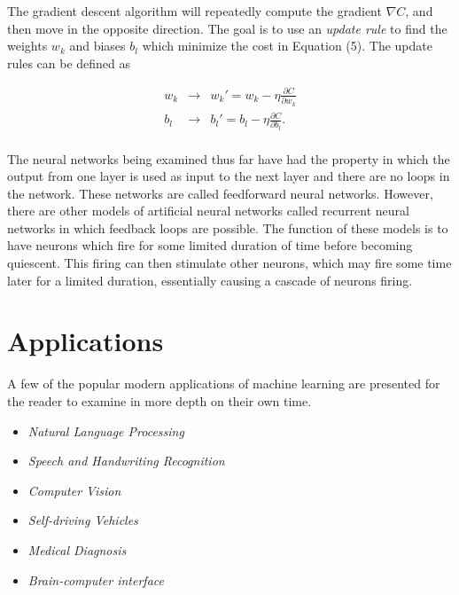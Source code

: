 \documentclass[12pt]{article}
\begin{document}
\noindent
The gradient descent algorithm will repeatedly compute the gradient $\nabla C$, and then move in the opposite direction. The goal is to use an \textit{update rule} to find the weights $w_k$ and biases $b_l$ which minimize the cost in Equation (5). The update rules can be defined as

\begin{eqnarray}
  w_k & \rightarrow & w_k' = w_k-\eta \frac{\partial C}{\partial w_k} \\
  b_l & \rightarrow & b_l' = b_l-\eta \frac{\partial C}{\partial b_l}.
\end{eqnarray}
\\

\noindent
The neural networks being examined thus far have had the property in which the output from one layer is used as input to the next layer and there are no loops in the network. These networks are called feedforward neural networks. However, there are other models of artificial neural networks called recurrent neural networks in which feedback loops are possible. The function of these models is to have neurons which fire for some limited duration of time before becoming quiescent. This firing can then stimulate other neurons, which may fire some time later for a limited duration, essentially causing a cascade of neurons firing.

\section*{Applications}
A few of the popular modern applications of machine learning are presented for the reader to examine in more depth on their own time.
\begin{itemize}
\renewcommand{\labelitemi}{\textbf{\textendash}}

    \item \textit{Natural Language Processing} 
    
    \item \textit{Speech and Handwriting Recognition}
    
    \item \textit{Computer Vision}
    
    \item \textit{Self-driving Vehicles}
    
    \item \textit{Medical Diagnosis} 
    
    \item \textit{Brain-computer interface}

\end{itemize}
\end{document}
